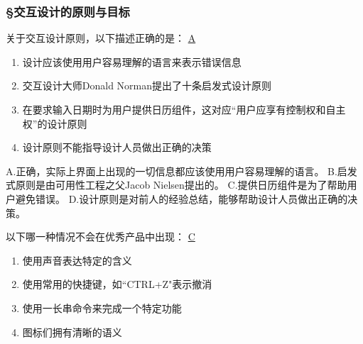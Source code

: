 \subsubsection*{\S 交互设计的原则与目标}
\setcounter{problemname}{0}

\begin{problem}
	关于交互设计原则，以下描述正确的是：
	\uline{A}    
        \begin{enumerate}[label=\Alph*.]
            \item 设计应该使用用户容易理解的语言来表示错误信息
            \item 交互设计大师Donald Norman提出了十条启发式设计原则
            \item 在要求输入日期时为用户提供日历组件，这对应“用户应享有控制权和自主权”的设计原则
            \item 设计原则不能指导设计人员做出正确的决策
        \end{enumerate}
\end{problem}

\begin{solution}
A.正确，实际上界面上出现的一切信息都应该使用用户容易理解的语言。 B.启发式原则是由可用性工程之父Jacob Nielsen提出的。 C.提供日历组件是为了帮助用户避免错误。 D.设计原则是对前人的经验总结，能够帮助设计人员做出正确的决策。
\end{solution}


\begin{problem}
	以下哪一种情况不会在优秀产品中出现：
	\uline{C}    
    \vspace{-0.8em}
    \begin{multicols}{2}
        \begin{enumerate}[label=\Alph*.]
            \item 使用声音表达特定的含义
            \item 使用常用的快捷键，如``CTRL+Z"表示撤消
            \item 使用一长串命令来完成一个特定功能
            \item 图标们拥有清晰的语义
        \end{enumerate}
    \end{multicols}
    \vspace{-1em}
\end{problem}

